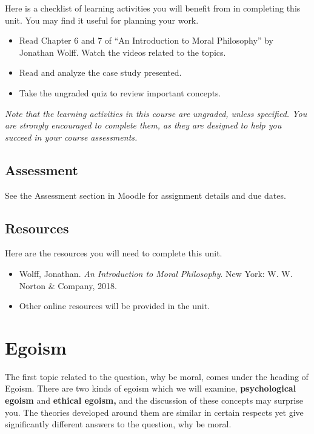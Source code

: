 \documentclass[
]{book}
\providecommand{\tightlist}{%
  \setlength{\itemsep}{0pt}\setlength{\parskip}{0pt}}
\begin{document}
Here is a checklist of learning activities you will benefit from in completing this unit. You may find it useful for planning your work.

\begin{itemize}
\tightlist
\item
  Read Chapter 6 and 7 of ``An Introduction to Moral Philosophy'' by Jonathan Wolff. Watch the videos related to the topics.
\item
  Read and analyze the case study presented.
\item
  Take the ungraded quiz to review important concepts.
\end{itemize}

\emph{Note that the learning activities in this course are ungraded, unless specified. You are strongly encouraged to complete them, as they are designed to help you succeed in your course assessments.}

\hypertarget{assessment-2}{%
\subsection*{Assessment}\label{assessment-2}}

See the Assessment section in Moodle for assignment details and due dates.

\hypertarget{resources-1}{%
\subsection*{Resources}\label{resources-1}}

Here are the resources you will need to complete this unit.

\begin{itemize}
\tightlist
\item
  Wolff, Jonathan. \emph{An Introduction to Moral Philosophy}. New York: W. W. Norton \& Company, 2018.
\item
  Other online resources will be provided in the unit.
\end{itemize}

\hypertarget{egoism}{%
\section{Egoism}\label{egoism}}

The first topic related to the question, why be moral, comes under the heading of Egoism. There are two kinds of egoism which we will examine, \textbf{psychological egoism} and \textbf{ethical egoism,} and the discussion of these concepts may surprise you. The theories developed around them are similar in certain respects yet give significantly different answers to the question, why be moral.
\end{document}
